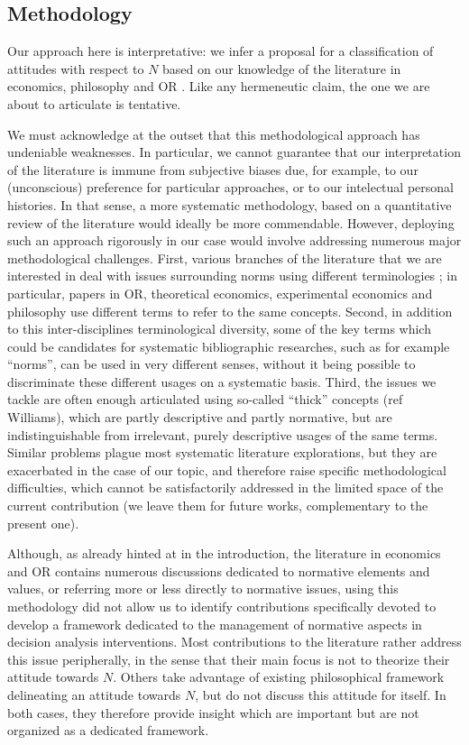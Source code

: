 \documentclass[preprint, french, english, 11pt, authoryear]{elsarticle}%
\begin{document}
\subsection{Methodology}
\begin{changebar}
Our approach here is interpretative: we infer a proposal for a classification of attitudes with respect to $N$ based on our knowledge of the literature in economics, philosophy and OR%
.
Like any hermeneutic claim, the one we are about to articulate is tentative.


We must acknowledge at the outset that this methodological approach has undeniable weaknesses. In particular, we cannot guarantee that our interpretation of the literature is immune from subjective biases due, for example, to our (unconscious) preference for particular approaches, or to our intelectual personal histories.
In that sense, a more systematic methodology, based on a quantitative review of the literature would ideally be more commendable. 
However, deploying such an approach rigorously in our case would involve addressing numerous major methodological challenges.
First, various branches of the literature that we are interested in deal with issues surrounding norms using different terminologies ; in particular, papers in OR, theoretical economics, experimental economics and philosophy use different terms to refer to the same concepts.
Second, in addition to this inter-disciplines terminological diversity, some of the key terms which could be candidates for systematic bibliographic researches, such as for example ``norms'', can be used in very different senses, without it being possible to discriminate these different usages on a systematic basis.
Third, the issues we tackle are often enough articulated using so-called ``thick'' concepts (ref Williams), which are partly descriptive and partly normative, but are indistinguishable from irrelevant, purely descriptive usages of the same terms.
Similar problems plague most systematic literature explorations, but they are exacerbated in the case of our topic, and therefore raise specific methodological difficulties, which cannot be satisfactorily addressed in the limited space of the current contribution (we leave them for future works, complementary to the present one). 


Although, as already hinted at in the introduction, the literature in economics and OR contains numerous discussions dedicated to normative elements and values, or referring more or less directly to normative issues, 
using this methodology did not allow us to identify contributions specifically devoted to develop a framework dedicated to the management of normative aspects in decision analysis interventions. 
Most contributions to the literature rather address this issue peripherally, in the sense that their main focus is not to theorize their attitude towards $N$. Others take advantage of existing philosophical framework delineating an attitude towards $N$, but do not discuss this attitude for itself.
In both cases, they therefore provide insight which are important but are not organized as a dedicated framework.


\end{changebar}
\end{document}
